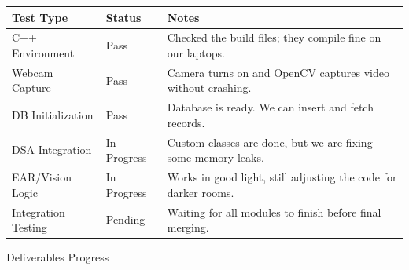 \documentclass[12pt,a4paper]{article}
\newcommand{\sectiontitle}[1]{%
    {\color{GEUBlue}\fontsize{18}{22}\selectfont #1}%
}
\begin{document}
\noindent
\begin{tabularx}{\textwidth}{
    |>{\raggedright\arraybackslash}p{}
    |>{\raggedright\arraybackslash}p{}
    |>{\raggedright\arraybackslash}X|
}
\hline
\textbf{Test Type} & \textbf{Status} & \textbf{Notes}
\\
\hline
C++ Environment & Pass &
Checked the build files; they compile fine on our laptops.
\\
\hline
Webcam Capture & Pass &
Camera turns on and OpenCV captures video without crashing.
\\
\hline
DB Initialization & Pass &
Database is ready. We can insert and fetch records.
\\
\hline
DSA Integration & In Progress &
Custom classes are done, but we are fixing some memory leaks.
\\
\hline
EAR/Vision Logic & In Progress &
Works in good light, still adjusting the code for darker rooms.
\\
\hline
Integration Testing & Pending &
Waiting for all modules to finish before final merging.
\\
\hline
\end{tabularx}

\vspace{0.35cm}

\sectiontitle{Deliverables Progress}

\vspace{0.15cm}
\end{document}
